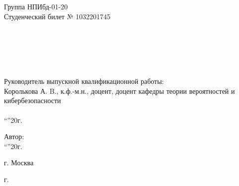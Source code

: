 \begin{titlepage}
  \begin{minipage}{.45\textwidth}
    Группа НПИбд-01-20\\
    Студенческий билет № 1032201745 \\ \\ \\ \\ \\ \\
  \end{minipage}%
  \hfill
  \begin{minipage}{.5\textwidth}
    Руководитель выпускной
    квалификационной работы: \\ [2mm]
    Королькова А. B., к.ф.-м.н., доцент, доцент кафедры теории вероятностей и кибербезопасности\\[2mm]
    \underline{\hspace{3cm}} \\
    ``\underline{\hspace{1cm}}''\underline{\hspace{3cm}}20\underline{\hspace{1cm}}г.
\end{minipage}%

\vfill

\hfill
\begin{minipage}{.5\textwidth}
  Автор: \underline{\hspace{3cm}} \\
  ``\underline{\hspace{1cm}}''\underline{\hspace{3cm}}20\underline{\hspace{1cm}}г.
\end{minipage}%


\vfill

\centering
г. Москва

 г.
\end{titlepage}
